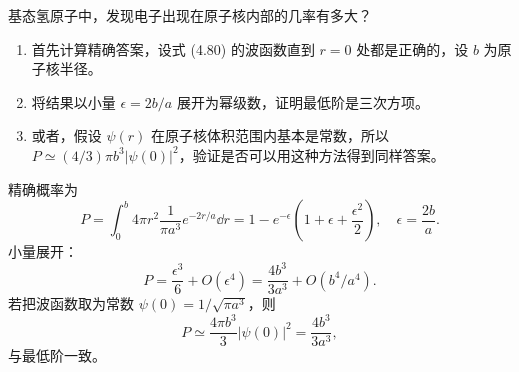 \begin{question}
基态氢原子中，发现电子出现在原子核内部的几率有多大？
\begin{enumerate}
\item 首先计算精确答案，设式 (4.80) 的波函数直到 $r=0$ 处都是正确的，设 $b$ 为原子核半径。
\item 将结果以小量 $\epsilon=2b/a$ 展开为幂级数，证明最低阶是三次方项。
\item 或者，假设 $\psi(r)$ 在原子核体积范围内基本是常数，所以 $P\simeq(4/3)\pi b^3|\psi(0)|^2$，验证是否可以用这种方法得到同样答案。
\end{enumerate}

\par\smallskip
{}

\end{question}
\begin{solution}

精确概率为
\[
P=\int_0^b4\pi r^2\frac{1}{\pi a^3}e^{-2r/a}\dd r
=1-e^{-\epsilon}\left(1+\epsilon+\frac{\epsilon^2}{2}\right),
\quad \epsilon=\frac{2b}{a}.
\]
小量展开：
\[
P=\frac{\epsilon^3}{6}+O(\epsilon^4)=\frac{4b^3}{3a^3}+O(b^4/a^4).
\]
若把波函数取为常数 $\psi(0)=1/\sqrt{\pi a^3}$，则
\[
P\simeq \frac{4\pi b^3}{3}|\psi(0)|^2=\frac{4b^3}{3a^3},
\]
与最低阶一致。

\end{solution}

